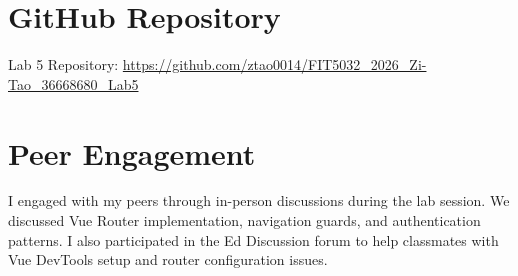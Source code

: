 \documentclass[12pt,a4paper]{article}
\begin{document}
\newpage

\section*{GitHub Repository}
Lab 5 Repository: \href{https://github.com/ztao0014/FIT5032_2026_Zi-Tao_36668680_Lab5}{https://github.com/ztao0014/FIT5032\_2026\_Zi-Tao\_36668680\_Lab5}

\section*{Peer Engagement}
I engaged with my peers through in-person discussions during the lab session. We discussed Vue Router implementation, navigation guards, and authentication patterns. I also participated in the Ed Discussion forum to help classmates with Vue DevTools setup and router configuration issues.
\end{document}
